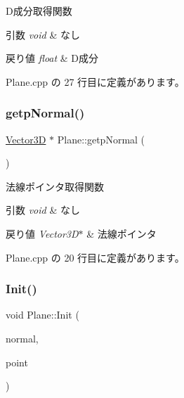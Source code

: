 D成分取得関数 


\begin{DoxyParams}{引数}
{\em void} & なし \\
\hline
\end{DoxyParams}

\begin{DoxyRetVals}{戻り値}
{\em float} & D成分 \\
\hline
\end{DoxyRetVals}


 Plane.\+cpp の 27 行目に定義があります。

\mbox{\label{class_plane_a8c279383bdaeb247e68c557960eb0c0c}} 
\subsubsection{\texorpdfstring{getp\+Normal()}{getpNormal()}}
{\footnotesize\ttfamily \mbox{\hyperlink{class_vector3_d}{Vector3D}} $\ast$ Plane\+::getp\+Normal (\begin{DoxyParamCaption}{ }\end{DoxyParamCaption})}



法線ポインタ取得関数 


\begin{DoxyParams}{引数}
{\em void} & なし \\
\hline
\end{DoxyParams}

\begin{DoxyRetVals}{戻り値}
{\em Vector3\+D$\ast$} & 法線ポインタ \\
\hline
\end{DoxyRetVals}


 Plane.\+cpp の 20 行目に定義があります。

\mbox{\label{class_plane_a2182719af8f880a3871be4cfc33a969b}} 
\subsubsection{\texorpdfstring{Init()}{Init()}\hspace{0.1cm}{\footnotesize\ttfamily [1/2]}}
{\footnotesize\ttfamily void Plane\+::\+Init (\begin{DoxyParamCaption}\item[{\mbox{\hyperlink{class_vector3_d}{Vector3D}}}]{normal,  }\item[{\mbox{\hyperlink{class_vector3_d}{Vector3D}}}]{point }\end{DoxyParamCaption})}



